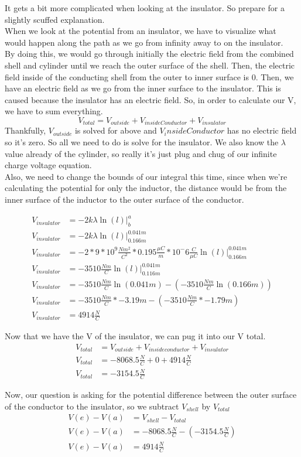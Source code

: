 \documentclass{article}
\begin{document}
It gets a bit more complicated when looking at the insulator. So prepare for a slightly scuffed explanation.\\

When we look at the potential from an insulator, we have to visualize what would happen along the path as we go from infinity away to on the insulator.\\ By doing this, we would go through initially the electric field from the combined shell and cylinder until we reach the outer surface of the shell. Then, the electric field inside of the conducting shell from the outer to inner surface is 0. Then, we have an electric field as we go from the inner surface to the insulator. This is caused because the insulator has an electric field. So, in order to calculate our V, we have to sum everything.
\[
	V_{total} = V_{outside} + V_{inside Conductor} + V_{insulator} 
\]
Thankfully, $V_{outside}$ is solved for above and $V_inside Conductor$ has no electric field so it's zero. So all we need to do is solve for the insulator. We also know the $\lambda$ value already of the cylinder, so really it's just plug and chug of our infinite charge voltage equation.\\
Also, we need to change the bounds of our integral this time, since when we're calculating the potential for only the inductor, the distance would be from the inner surface of the inductor to the outer surface of the conductor.

\begin{align*}
	V_{insulator} &= -2k\lambda\ln(l)\bigg|^a_{b}\\
	V_{insulator} &= -2k\lambda\ln(l)\bigg|^{0.041m}_{0.166m}\\
	V_{insulator}&= -2 * 9 * 10^9 \frac{Nm^2}{C^2} * 0.195 \frac{\mu C}{m} * 10^-6 \frac{C}{\mu C} \ln(l)\bigg|^{0.041m}_{0.166m}\\
	V_{insulator} &= -3510 \frac{Nm}{C} \ln(l)\bigg|^{0.041m}_{0.116m}\\
	V_{insulator} &= -3510 \frac{Nm}{C}\ln(0.041m) -  (-3510 \frac{Nm}{C}\ln(0.166m)) \\
	V_{insulator} &= -3510 \frac{Nm}{C}* -3.19m - ( -3510 \frac{Nm}{C}* -1.79m)\\
	V_{insulator} &= 4914 \frac{N}{C}
\end{align*}

Now that we have the V of the insulator, we can pug it into our V total.
\begin{align*}
	V_{total} &= V_{outside} + V_{inside conductor} + V_{insulator}\\
	V_{total} &= -8068.5 \frac{N}{C} + 0 + 4914 \frac{N}{C}\\
	V_{total} &= -3154.5 \frac{N}{C}
\end{align*}

Now, our question is asking for the potential difference between the outer surface of the conductor to the insulator, so we subtract $V_{shell}$ by $V_{total} $
\begin{align*}
	V(e) - V(a) &= V_{shell} - V_{total}\\
	V(e) - V(a) &= -8068.5 \frac{N}{C} - (-3154.5 \frac{N}{C})\\
	V(e) - V(a) &= 4914 \frac{N}{C}
\end{align*}
\end{document}
